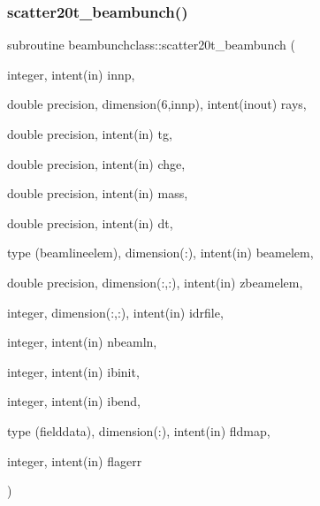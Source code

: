 \subsubsection{\texorpdfstring{scatter20t\_beambunch()}{scatter20t\_beambunch()}}
{\footnotesize\ttfamily subroutine beambunchclass\+::scatter20t\+\_\+beambunch (\begin{DoxyParamCaption}\item[{integer, intent(in)}]{innp,  }\item[{double precision, dimension(6,innp), intent(inout)}]{rays,  }\item[{double precision, intent(in)}]{tg,  }\item[{double precision, intent(in)}]{chge,  }\item[{double precision, intent(in)}]{mass,  }\item[{double precision, intent(in)}]{dt,  }\item[{type (beamlineelem), dimension(\+:), intent(in)}]{beamelem,  }\item[{double precision, dimension(\+:,\+:), intent(in)}]{zbeamelem,  }\item[{integer, dimension(\+:,\+:), intent(in)}]{idrfile,  }\item[{integer, intent(in)}]{nbeamln,  }\item[{integer, intent(in)}]{ibinit,  }\item[{integer, intent(in)}]{ibend,  }\item[{type (fielddata), dimension(\+:), intent(in)}]{fldmap,  }\item[{integer, intent(in)}]{flagerr }\end{DoxyParamCaption})}

